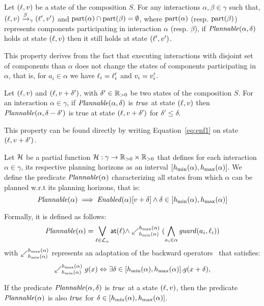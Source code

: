 \begin{property}\label{pt:plnIn1}
  Let $(\ell,v)$ be a state of the composition $S$. For any interactions $\alpha,\beta\in\gamma$ such that, $(\ell,v)\xrightarrow{\beta}_{\gamma}(\ell',v')$
  and $\mathrm{part}(\alpha)\cap\mathrm{part}(\beta)=\emptyset$, where $\mathrm{part}(\alpha)$ (resp. $\mathrm{part}(\beta)$) represents components participating in 
  interaction $\alpha$ (resp. $\beta$), if $\mathit{Plannable(\alpha,\delta)}$ holds at state $(\ell,v)$ then it still holds at state $(\ell',v')$.
\end{property}
This property derives from the fact that executing interactions with disjoint set of components than $\alpha$ does not change the states
of components participating in $\alpha$, that is, for $a_i\in\alpha$ we have $\ell_i=\ell'_i$ and $v_i=v'_i$.


\begin{property}\label{pt:plnIn2}
  Let $(\ell,v)$ and $(\ell,v+\delta')$, with $\delta'\in\mathbb R_{> 0}$ be two states of the composition $S$. 
  For an interaction $\alpha\in\gamma$, if $\mathit{Plannable(\alpha,\delta)}$ is $\textnormal{\textit{true}}$ at state $(\ell,v)$ then $\mathit{Plannable(\alpha,\delta-\delta')}$ is true at state
  $(\ell,v+\delta')$ for $\delta'\le\delta$.
\end{property}
This property can be found directly by writing Equation~\ref{eq:enf1} on state $(\ell,v+\delta')$.

Let $\mathcal{H}$ be a partial function $\mathcal{H}: \gamma \to\mathbb R_{> 0}\times\mathbb R_{> 0}$ that defines for each
interaction $\alpha\in\gamma$, its respective planning horizons as an interval $[h_{\min}(\alpha),h_{\max}(\alpha)]$. 
We define the predicate $\mathit{Plannable(\alpha)}$ characterizing all states from which 
$\alpha$ can be planned w.r.t its planning horizons, that is:
  \begin{equation}\label{eq:enf1}
    \mathit{Plannable(\alpha)}\implies\mathit{Enabled}(\alpha)[v+\delta]\wedge\delta\in[h_{\min}(\alpha),h_{\max}(\alpha)]  
  \end{equation}

Formally, it is defined as follows:
\begin{displaymath}
  \mathit{Plannable(\alpha)}=\bigvee_{\ell\in\mathcal{L}_{\alpha}} \textnormal{\textsf{at}}(\ell)\wedge\swarrow^{h_{\max}(\alpha)}_{h_{\min}(\alpha)}(\bigwedge_{a_i\in\alpha} \mathit{guard}(a_i,\ell_i))
\end{displaymath}
  with $\swarrow^{h_{\max}(\alpha)}_{h_{\min}(\alpha)}$ represents an adaptation of the backward operators~\cite{tripakis98:thesis} that satisfies:
\begin{displaymath}
\swarrow^{h_{\max}(\alpha)}_{h_{\min}(\alpha)}g(x)\Leftrightarrow\exists\delta\in[h_{\min}(\alpha),h_{\max}(\alpha)].g(x+\delta),
\end{displaymath}
\begin{property}\label{pt:pln}
  If the predicate $\mathit{Plannable(\alpha,\delta)}$ is $\textnormal{\textit{true}}$ at a state $(\ell,v)$, then the 
  predicate $\mathit{Plannable(\alpha)}$ is also $\textnormal{\textit{true}}$ for $\delta\in[h_{\min}(\alpha),h_{\max}(\alpha)]$.
\end{property}

